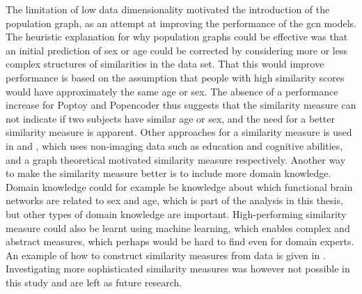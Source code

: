 The limitation of low data dimensionality motivated the introduction of the population graph, as an attempt at improving the performance of the \acrshort{gcn} models. The heuristic explanation for why population graphs could be effective was that an initial prediction of sex or age could be corrected by considering more or less complex structures of similarities in the data set. That this would improve performance is based on the assumption that people with high similarity scores would have approximately the same age or sex. The absence of a performance increase for Poptoy and Popencoder thus suggests that the similarity measure can not indicate if two subjects have similar age or sex, and the need for a better similarity measure is apparent. Other approaches for a similarity measure is used in \cite{stankeviciute} and \cite{higcn}, which uses non-imaging data such as education and cognitive abilities, and a graph theoretical motivated similarity measure respectively. Another way to make the similarity measure better is to include more domain knowledge. Domain knowledge could for example be knowledge about which functional brain networks are related to sex and age, which is part of the analysis in this thesis, but other types of domain knowledge are important. High-performing similarity measure could also be learnt using machine learning, which enables complex and abstract measures, which perhaps would be hard to find even for domain experts. An example of how to construct similarity measures from data is given in \cite{sim_meas_constr}. Investigating more sophisticated similarity measures was however not possible in this study and are left as future research. 




